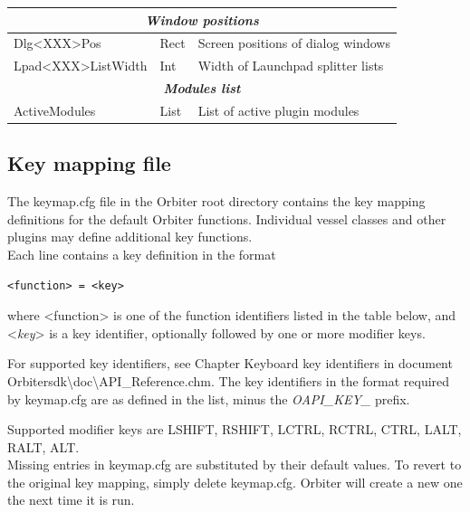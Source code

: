 \documentclass[Orbiter User Manual.tex]{subfiles}
\begin{document}
\begin{longtable}{ |p{}|p{}|p{}| }
	\hline
	\multicolumn{3}{|c|}{\rule{0pt}{2ex}\textbf{\textit{Window positions}}}\\
	\hline\rule{0pt}{2ex}
	Dlg<XXX>Pos & Rect & Screen positions of dialog windows\\
	\hline\rule{0pt}{2ex}
	Lpad<XXX>ListWidth & Int & Width of Launchpad splitter lists\\
	\hline
	\multicolumn{3}{|c|}{\rule{0pt}{2ex}\textbf{\textit{Modules list}}}\\
	\hline\rule{0pt}{2ex}
	ActiveModules & List & List of active plugin modules\\
	\hline
	\end{longtable}


\subsection{Key mapping file}
The keymap.cfg file in the Orbiter root directory contains the key mapping definitions for the default Orbiter functions. Individual vessel classes and other plugins may define additional key functions.\\
Each line contains a key definition in the format

\begin{lstlisting}[language=OSFS]
<function> = <key>
\end{lstlisting}

\noindent
where <function> is one of the function identifiers listed in the table below, and <\textit{key}> is a key identifier, optionally followed by one or more modifier keys.
\begin{sloppypar}%
\noindent
For supported key identifiers, see Chapter Keyboard key identifiers in document Orbitersdk\textbackslash doc\textbackslash API\_Reference.chm. The key identifiers in the format required by keymap.cfg are as defined in the list, minus the \textit{OAPI\_KEY\_} prefix.
\end{sloppypar}
\noindent
Supported modifier keys are LSHIFT, RSHIFT, LCTRL, RCTRL, CTRL, LALT, RALT, ALT.\\
Missing entries in keymap.cfg are substituted by their default values. To revert to the original key mapping, simply delete keymap.cfg. Orbiter will create a new one the next time it is run.
\end{document}
